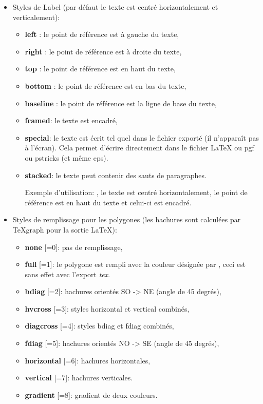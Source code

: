\begin{itemize}
\begin{itemize}
    \item Styles de Label (par défaut le texte est centré horizontalement et verticalement):
        \begin{itemize}
        \item \textbf{left} : le point de référence est à gauche du texte,
        \item \textbf{right} : le point de référence est à droite du texte,
        \item \textbf{top} : le point de référence est en haut du texte,
        \item \textbf{bottom} : le point de référence est en bas du texte,
        \item \textbf{baseline} : le point de référence est la ligne de base du texte,
        \item \textbf{framed}: le texte est encadré,
        \item \textbf{special}: le texte est écrit tel quel dans le fichier exporté (il n'apparaît pas à l'écran). Cela permet d'écrire directement dans le fichier LaTeX ou pgf ou pstricks (et même eps).
        \item \textbf{stacked}: le texte peut contenir des sauts de paragraphes.
        
Exemple d'utilisation: , le texte est centré horizontalement, le point de référence  est en haut du texte et celui-ci est encadré.
        \end{itemize}

    \item Styles de remplissage pour les polygones (les hachures sont calculées par TeXgraph pour la sortie LaTeX):
        \begin{itemize}
        \item \textbf{none} [=0]: pas de remplissage,
        \item \textbf{full} [=1]: le polygone est rempli avec la couleur désignée par , ceci est sans effet avec l'export \textit{tex}.
        \item \textbf{bdiag} [=2]: hachures orientés SO -> NE (angle de 45 degrés),
        \item \textbf{hvcross} [=3]: styles horizontal et vertical combinés,
        \item \textbf{diagcross} [=4]: styles bdiag et fdiag combinés,
        \item \textbf{fdiag} [=5]: hachures orientés NO -> SE (angle de 45 degrés),
        \item \textbf{horizontal} [=6]: hachures horizontales,
        \item \textbf{vertical} [=7]: hachures verticales.
        \item \textbf{gradient} [=8]: gradient de deux couleurs.
        \end{itemize}
        

\end{itemize}
\end{itemize}
